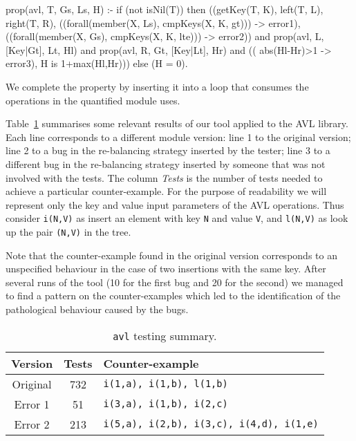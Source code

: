 \documentclass[runningheads,a4paper]{llncs}
\newcommand{\yap}[1]{\lstinline[style=yap]{#1}}
\newcommand{\refTabI}[1]{Table~\ref{#1}}
\begin{document}
\begin{yapcode}
prop({avl, T, Gs, Ls, H}) :- if (not isNil(T)) then
 ((getKey(T, K), left(T, L),  right(T, R),
      ((forall(member(X, Ls), cmpKeys(X, K, gt))) -> error1),
      ((forall(member(X, Gs), cmpKeys(X, K, lte))) -> error2))
   and prop({avl, L, [Key|Gt], Lt, Hl})
   and prop({avl, R, Gt, [Key|Lt], Hr})
   and (( abs(Hl-Hr)>1 -> error3), H is 1+max(Hl,Hr)))
 else (H = 0).
\end{yapcode}
%
We complete the property by inserting it into a loop that consumes the
operations in the quantified module uses.



\refTabI{tab:avl-tests} summarises some relevant results of our tool
applied to the AVL library.
%
Each line corresponds to a different module version: line 1 to the
original version; line 2 to a bug in the re-balancing strategy inserted
by the tester; line 3 to a different bug in the re-balancing
strategy inserted by someone that was not involved with the tests.
%
The column \emph{Tests} is the number of tests needed to achieve a
particular counter-example.
%
For the purpose of readability we will represent only the key and value
input parameters of the AVL operations.
%
Thus consider \yap{i(N,V)} as insert an
element with key \yap{N} and value  \yap{V}, and \yap{l(N,V)} as look up
the pair \yap{(N,V)} in the tree.


Note that the counter-example found in the original version corresponds
to an unspecified behaviour in the case of two insertions with the same key.
%
After several runs of the tool (10 for the first bug and 20 for the
second) we managed to find a pattern on the counter-examples which led
to the identification of the pathological behaviour caused by the bugs.


\begin{table}
  \centering
  \begin{tabular}{|c|c|l|}
    \hline
    Version    &  Tests   &  Counter-example
    \\ \hline
    Original   &  732     &  \yap{i(1,a), i(1,b), l(1,b)}
    \\ \hline
    Error 1    &  51      &  \yap{i(3,a), i(1,b), i(2,c)}
    \\ \hline
    Error 2    &  213     &  \yap{i(5,a), i(2,b), i(3,c), i(4,d), i(1,e)}
    \\ \hline
  \end{tabular}
  \caption{{\tt avl} testing summary.}
  \label{tab:avl-tests}
\end{table}
\end{document}
